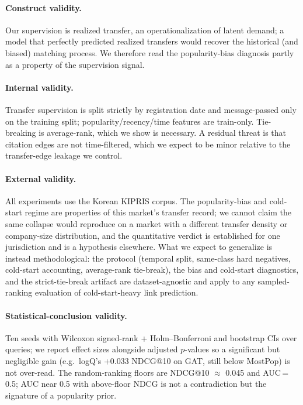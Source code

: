 \documentclass[preprint,12pt]{elsarticle}
\begin{document}
\paragraph{Construct validity.} Our supervision is realized transfer, an
operationalization of latent demand; a model that perfectly predicted realized
transfers would recover the historical (and biased) matching process. We therefore
read the popularity-bias diagnosis partly as a property of the supervision signal.

\paragraph{Internal validity.} Transfer supervision is split strictly by registration
date and message-passed only on the training split; popularity/recency/time features
are train-only. Tie-breaking is average-rank, which we show is necessary. A residual
threat is that citation edges are not time-filtered, which we expect to be minor
relative to the transfer-edge leakage we control.

\paragraph{External validity.} All experiments use the Korean KIPRIS corpus. The
popularity-bias and cold-start regime are properties of this market's transfer record;
we cannot claim the same collapse would reproduce on a market with a different transfer
density or company-size distribution, and the quantitative verdict is established for
one jurisdiction and is a hypothesis elsewhere. What we expect to generalize is instead
methodological: the protocol (temporal split, same-class hard negatives, cold-start
accounting, average-rank tie-break), the bias and cold-start diagnostics, and the
strict-tie-break artifact are dataset-agnostic and apply to any sampled-ranking
evaluation of cold-start-heavy link prediction.

\paragraph{Statistical-conclusion validity.} Ten seeds with Wilcoxon signed-rank +
Holm--Bonferroni and bootstrap CIs over queries; we report effect sizes alongside
adjusted $p$-values so a significant but negligible gain (e.g.\ logQ's $+0.033$ NDCG@10
on GAT, still below MostPop) is not over-read. The random-ranking floors are
NDCG@10 $\approx$ 0.045 and AUC\,=\,0.5; AUC near 0.5 with above-floor NDCG is not a
contradiction but the signature of a popularity prior.
\end{document}

